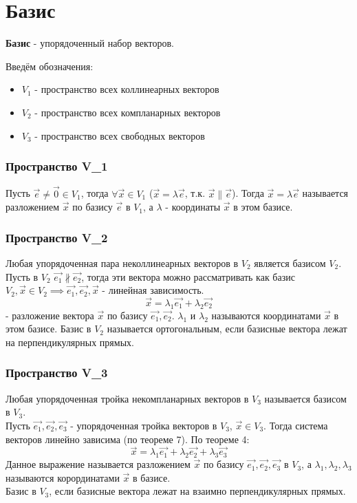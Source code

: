\section{Базис}

\begin{definition}
  \textbf{Базис} - упорядоченный набор векторов.
\end{definition}

Введём обозначения:
\begin{itemize}
  \item $V_1$ - пространство всех коллинеарных векторов
  \item $V_2$ - пространство всех компланарных векторов
  \item $V_3$ - пространство всех свободных векторов
\end{itemize}

\subsubsection*{Пространство V_1}
Пусть $\vec{e} \neq \vec{0} \in V_1$, тогда $\forall \vec{x} \in V_1$ ($\vec{x} = \lambda \vec{e}$, т.к. $\vec{x} \parallel \vec{e}$). Тогда $\vec{x} = \lambda \vec{e}$ называется разложением $\vec{x}$ по базису $\vec{e}$ в $V_1$, а  $\lambda$ - координаты $\vec{x}$ в этом базисе.

\subsubsection*{Пространство V_2}
Любая упорядоченная пара неколлинеарных векторов в $V_2$ является базисом $V_2$. \\
Пусть в $V_2$ $\vec{e_1} \not \parallel \vec{e_2}$, тогда эти вектора можно рассматривать как базис $V_2, \vec{x} \in V_2 \implies \vec{e_1}, \vec{e_2}, \vec{x}$ - линейная зависимость. 
\[
  \vec{x} = \lambda_1 \vec{e_1} + \lambda_2 \vec{e_2}
\]
- разложение вектора $\vec{x}$ по базису $\vec{e_1}, \vec{e_2}$. $\lambda_1$ и $\lambda_2$ называются координатами $\vec{x}$ в этом базисе.
Базис в $V_2$ называется ортогональным, если базисные вектора лежат на перпендикулярных прямых.

\subsubsection*{Пространство V_3}
Любая упорядоченная тройка некомпланарных векторов в $V_3$ называется базисом в $V_3$.\\
Пусть $\vec{e_1}, \vec{e_2}, \vec{e_3}$ - упорядоченная тройка векторов в $V_3$, $\vec{x} \in V_3$. Тогда система векторов линейно зависима (по теореме 7). По теореме 4:
\[
  \vec{x} = \lambda_1 \vec{e_1} + \lambda_2 \vec{e_2} + \lambda_3 \vec{e_3}
\] 
Данное выражение называется разложением $\vec{x}$ по базису $\vec{e_1}, \vec{e_2}, \vec{e_3}$ в $V_3$, а $\lambda_1, \lambda_2, \lambda_3$ называются корординатами $\vec{x}$ в базисе. \\
Базис в $V_3$, если базисные вектора лежат на взаимно перпендикулярных прямых.

